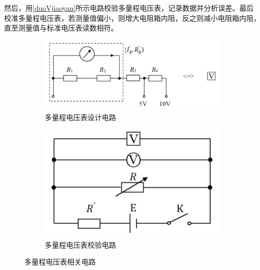 \documentclass{../template/Preport}
\begin{document}
    然后，用\autoref{duoVjiaoyan}所示电路校验多量程电压表，记录数据并分析误差。最后校准多量程电压表，若测量值偏小，则增大电阻箱内阻，反之则减小电阻箱内阻，直至测量值与标准电压表读数相符。
    \begin{figure}[htbp]
        \centering
        \begin{subfigure}[b]{0.45\textwidth}
            \includegraphics[width=\textwidth]{figures/duoliangchengdianya.png}
            \caption{多量程电压表设计电路}
            \label{duoliangchengdianya}
        \end{subfigure}
        \hfill
        \begin{subfigure}[b]{0.45\textwidth}
            \includegraphics[width=\textwidth]{figures/duoVjiaoyan.png}
            \caption{多量程电压表校验电路}
            \label{duoVjiaoyan}
        \end{subfigure}
        \caption{多量程电压表相关电路}
    \end{figure}
\end{document}
